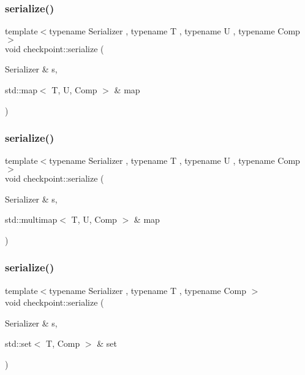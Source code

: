 \subsubsection{\texorpdfstring{serialize()}{serialize()}\hspace{0.1cm}{\footnotesize\ttfamily [16/30]}}
{\footnotesize\ttfamily template$<$typename Serializer , typename T , typename U , typename Comp $>$ \\
void checkpoint\+::serialize (\begin{DoxyParamCaption}\item[{Serializer \&}]{s,  }\item[{std\+::map$<$ T, U, Comp $>$ \&}]{map }\end{DoxyParamCaption})\hspace{0.3cm}{\ttfamily [inline]}}

\mbox{\label{namespacecheckpoint_a44434f578fc304afa3a62a9305be2a65}} 
\subsubsection{\texorpdfstring{serialize()}{serialize()}\hspace{0.1cm}{\footnotesize\ttfamily [17/30]}}
{\footnotesize\ttfamily template$<$typename Serializer , typename T , typename U , typename Comp $>$ \\
void checkpoint\+::serialize (\begin{DoxyParamCaption}\item[{Serializer \&}]{s,  }\item[{std\+::multimap$<$ T, U, Comp $>$ \&}]{map }\end{DoxyParamCaption})\hspace{0.3cm}{\ttfamily [inline]}}

\mbox{\label{namespacecheckpoint_a9f1869781f4cce4db94c144174680b24}} 
\subsubsection{\texorpdfstring{serialize()}{serialize()}\hspace{0.1cm}{\footnotesize\ttfamily [18/30]}}
{\footnotesize\ttfamily template$<$typename Serializer , typename T , typename Comp $>$ \\
void checkpoint\+::serialize (\begin{DoxyParamCaption}\item[{Serializer \&}]{s,  }\item[{std\+::set$<$ T, Comp $>$ \&}]{set }\end{DoxyParamCaption})\hspace{0.3cm}{\ttfamily [inline]}}

